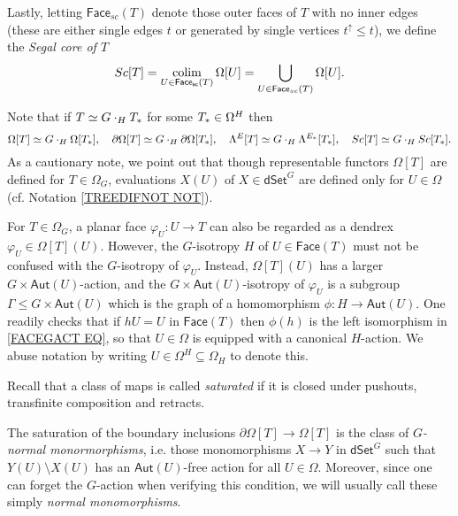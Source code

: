 \documentclass[a4paper,10pt
,draft
]{article}%
\begin{document}
Lastly, letting $\mathsf{Face}_{sc}(T)$ denote those outer faces of $T$ with no inner edges (these are either single edges $t$ or generated by single vertices $t^{\uparrow} \leq t$), we define the 
\textit{Segal core of $T$}
\[
	Sc[T] 
= 
	\mathop{\operatorname{colim}}_{U \in 
	\mathsf{Face_{sc}}(T)}
	\Omega[U] 
=
	\bigcup_{U \in 
	\mathsf{Face}_{sc}(T)}
	\Omega[U].
\]

Note that if $T \simeq G \cdot_H T_{\**}$ for some $T_{\**} \in \Omega^H$ then 
\begin{equation}\label{T_DECOMP_EQ}
	\Omega[T] \simeq G \cdot_H \Omega[T_{\**}], 
\quad
	\partial \Omega[T] \simeq G \cdot_H \partial \Omega[T_{\**}], \quad
	\Lambda^{E}[T] \simeq G \cdot_H \Lambda^{E_{\**}}[T_{\**}],
\quad
	Sc[T] \simeq G \cdot_H Sc[T_{\**}].
\end{equation}
As a cautionary note, we point out that though representable functors $\Omega[T]$ are defined for $T \in \Omega_G$,
evaluations $X(U)$ of $X \in \mathsf{dSet}^G$
are defined only for $U \in \Omega$ (cf. Notation \ref{TREEDIFNOT NOT}).

\begin{remark}\label{FACEGACT REM}
	For $T \in \Omega_G$, a planar face $\varphi_U \colon U \to T$
	can also be regarded as a dendrex $\varphi_U \in \Omega[T](U)$.
	However, the $G$-isotropy $H$ of $U \in \mathsf{Face}(T)$ must not be confused with the $G$-isotropy of $\varphi_U$.
	Instead, $\Omega[T](U)$ has a larger $G \times \mathsf{Aut}(U)$-action,
	and the $G \times \mathsf{Aut}(U)$-isotropy of $\varphi_U$
	is a subgroup 
	$\Gamma \leq G \times \mathsf{Aut}(U)$
	which is the graph of a homomorphism
	$\phi\colon H \to \mathsf{Aut}(U)$.
	One readily checks that if $hU = U$ in $\mathsf{Face}(T)$ then
	$\phi(h)$ is the left isomorphism in \eqref{FACEGACT EQ},
	so that $U\in \Omega$ is equipped with a canonical $H$-action.
	We abuse notation by writing 
	$U \in \Omega^H \subseteq \Omega_H$ to denote this.  
\end{remark}


Recall that a class of maps is called \textit{saturated} if it is closed under pushouts, transfinite composition and retracts. 

The saturation of the boundary inclusions 
$\partial \Omega[T] \to \Omega[T]$
is the class of \textit{$G$-normal monormorphisms},
i.e. those monomorphisms $X \to Y$ in $\mathsf{dSet}^G$ such that
$Y(U) \setminus X(U)$ has an $\mathsf{Aut}(U)$-free action for all $U \in \Omega$. 
Moreover, since one can forget the $G$-action when verifying this condition, we will usually call these simply \textit{normal monomorphisms}.
\end{document}
